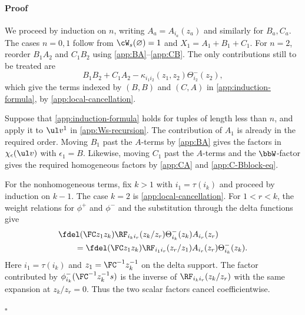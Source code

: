 \documentclass[reqno]{amsart}
\numberwithin{equation}{section}
\newenvironment{pf}{\medskip\paragraph{{\sc Proof}}}{\hfill$\square$\par\medskip}
\begin{document}
\begin{pf}
	We proceed by induction on $n$, writing $A_a=A_{i_a}(z_a)$ and similarly for 
	$B_a,C_a$. The cases $n=0,1$ follow from $\cW_s(\varnothing)=1$ and 
	$X_1=A_1+B_1+C_1$. For $n=2$, reorder $B_1A_2$ and $C_1B_2$ using
	\eqref{app:BA}--\eqref{app:CB}. The only contributions still to be treated are
	\[
	B_1B_2+C_1A_2-\kappa_{i_1i_2}(z_1,z_2)\Theta^-_{i_2}(z_2),
	\]
	which give the terms indexed by $(B,B)$ and $(C,A)$ in \eqref{app:induction-formula}, 
	by \eqref{app:local-cancellation}.
	
	Suppose that \eqref{app:induction-formula} holds for tuples of length less than $n$, and 
	apply it to $\ul v^1$ in \eqref{app:Ws-recursion}. The contribution of $A_1$ is already in 
	the required order. Moving $B_1$ past the $A$-terms by \eqref{app:BA} gives the 
	factors in $\chi_\epsilon(\ul v)$ with $\epsilon_1=B$. Likewise, moving $C_1$ past the 
	$A$-terms and the $\bbW$-factor gives the required homogeneous factors by 
	\eqref{app:CA} and \eqref{app:C-Bblock-eq}.
	
	For the nonhomogeneous terms, fix $k>1$ with $i_1=\tau(i_k)$ and proceed by 
	induction on $k-1$. The case $k=2$ is \eqref{app:local-cancellation}. For $1<r<k$, the 
	weight relations for $\phi^+$ and $\phi^-$ and the substitution through the delta 
	functions give
	\begin{equation}
		\begin{aligned}
			&\fdel(\FC z_1z_k)\RF_{i_ki_r}(z_k/z_r)
			\Theta_{i_k}^-(z_k)A_{i_r}(z_r)\\
			&\qquad=\fdel(\FC z_1z_k)\RF_{i_1i_r}(z_r/z_1)
			A_{i_r}(z_r)\Theta_{i_k}^-(z_k).
		\end{aligned}
		\label{app:theta-A-ordering}
	\end{equation}
	Here $i_1=\tau(i_k)$ and $z_1={\FC^{-1}z_k^{-1}}$ on the delta support.
	The factor contributed by $\phi_{i_k}^-(\FC^{-1}z_k^{-1}s)$ is the inverse of
	$\RF_{i_ki_r}(z_k/z_r)$ with the same expansion at $z_k/z_r=0$.
	Thus the two scalar factors cancel coefficientwise.
	

\end{pf}
\end{document}
